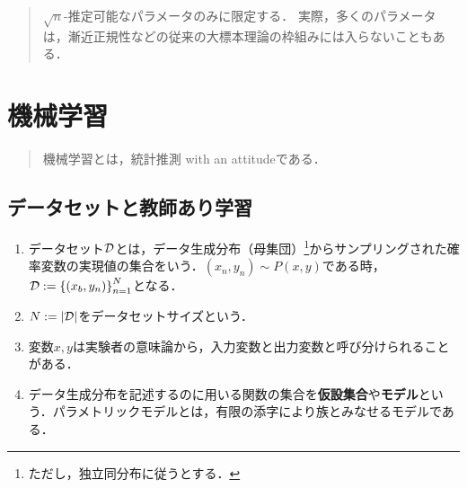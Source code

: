 \documentclass[uplatex,dvipdfmx]{jsreport}
\begin{document}
\begin{quotation}
    $\sqrt{n}$-推定可能なパラメータのみに限定する．
    実際，多くのパラメータは，漸近正規性などの従来の大標本理論の枠組みには入らないこともある．
\end{quotation}

\chapter{機械学習}

\begin{quotation}
    機械学習とは，統計推測 with an attitudeである．
\end{quotation}

\section{データセットと教師あり学習}

\begin{definition}\mbox{}
    \begin{enumerate}
        \item データセット$\mathcal{D}$とは，データ生成分布（母集団）\footnote{ただし，独立同分布に従うとする．}からサンプリングされた確率変数の実現値の集合をいう．$(x_n,y_n)\sim P(x,y)$である時，$\mathcal{D}:=\left\{(x_b,y_n)\right\}_{n=1}^N$となる．
        \item $N:=\lvert\mathcal{D}\rvert$をデータセットサイズという．
        \item 変数$x,y$は実験者の意味論から，入力変数と出力変数と呼び分けられることがある．
        \item データ生成分布を記述するのに用いる関数の集合を\textbf{仮設集合}や\textbf{モデル}という．パラメトリックモデルとは，有限の添字により族とみなせるモデルである．
    \end{enumerate}
\end{definition}
\end{document}
